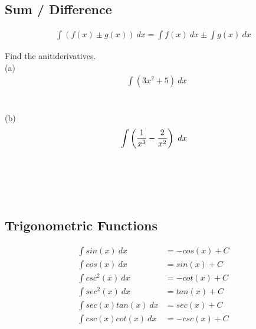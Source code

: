 \subsection{Sum / Difference}

\begin{theorem}
    \begin{align}
        \int (f(x) \pm g(x)) \ dx = \int f(x) \ dx \pm \int g(x) \ dx
    \end{align}
\end{theorem}

\begin{exercise}\nonumber
    Find the anitiderivatives. \\

    (a)
    \begin{align}
         & \int (3x^2 + 5) \ dx \\
        \\
        \\
        \\
    \end{align}

    (b)
    \begin{align}
         & \int \left({1 \over x^3} - {2 \over x^2}\right) \ dx \\
        \\
        \\
        \\
        \\
    \end{align}
\end{exercise}

\subsection{Trigonometric Functions}

\begin{theorem}
    \begin{align}
        \int sin(x) \ dx       & = -cos(x) + C \\
        \int cos(x) \ dx       & = sin(x) + C  \\
        \int csc^2(x) \ dx     & = -cot(x) + C \\
        \int sec^2(x) \ dx     & = tan(x) + C  \\
        \int sec(x)tan(x) \ dx & = sec(x) + C  \\
        \int csc(x)cot(x) \ dx & = -csc(x) + C
    \end{align}
\end{theorem}


